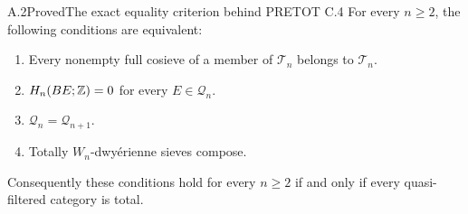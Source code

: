 \begin{claim}{A.2}{Proved}{The exact equality criterion behind PRETOT C.4}\label{A:equality-criterion}
For every $n\geq2$, the following conditions are equivalent:
\begin{enumerate}
\item Every nonempty full cosieve of a member of $\mathcal T_n$ belongs to $\mathcal T_n$.
\item $H_n(BE;\mathbb Z)=0$ for every $E\in\mathcal Q_n$.
\item $\mathcal Q_n=\mathcal Q_{n+1}$.
\item Totally $W_n$-dwy\'erienne sieves compose.
\end{enumerate}
Consequently these conditions hold for every $n\geq2$ if and only if every quasi-filtered category is total.
\end{claim}
